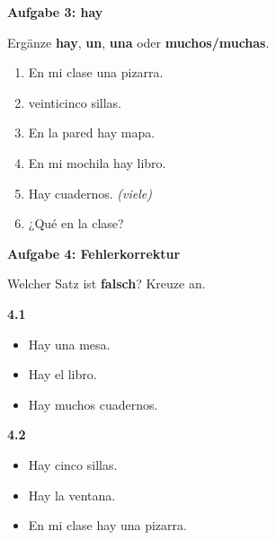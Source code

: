 \documentclass[11pt,a4paper]{article}
\newcommand{\luecke}[1]{\underline{\hspace{#1}}}
\newcommand{\punktebox}[1]{\hfill\fbox{\small \_/#1}}
\begin{document}
\vspace{0.8cm}

\noindent\textbf{Aufgabe 3: hay} \punktebox{6}

\noindent Ergänze \textbf{hay}, \textbf{un}, \textbf{una} oder \textbf{muchos/muchas}.

\vspace{0.3cm}

\begin{enumerate}[label=3.\arabic*]
    \item En mi clase \luecke{2cm} una pizarra.
    \item \luecke{2cm} veinticinco sillas.
    \item En la pared hay \luecke{2cm} mapa.
    \item En mi mochila hay \luecke{2cm} libro.
    \item Hay \luecke{2cm} cuadernos. \textit{(viele)}
    \item ¿Qué \luecke{2cm} en la clase?
\end{enumerate}

\vspace{0.8cm}

\noindent\textbf{Aufgabe 4: Fehlerkorrektur} \punktebox{5}

\noindent Welcher Satz ist \textbf{falsch}? Kreuze an.

\vspace{0.3cm}

\textbf{4.1}
\begin{itemize}[label=$\bigcirc$, nosep]
    \item Hay una mesa.
    \item Hay el libro.
    \item Hay muchos cuadernos.
\end{itemize}

\vspace{0.3cm}

\textbf{4.2}
\begin{itemize}[label=$\bigcirc$, nosep]
    \item Hay cinco sillas.
    \item Hay la ventana.
    \item En mi clase hay una pizarra.
\end{itemize}
\end{document}
